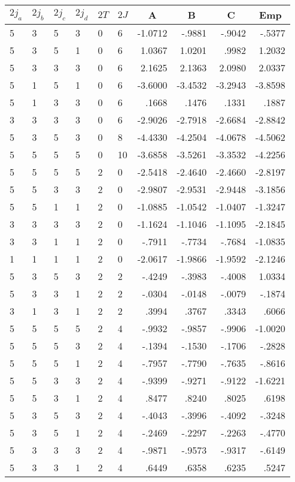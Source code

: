 \clearpage
\small
\begin{center}
\begin{tabular}{llllllrrrr}
\hline
$2j_{a}$&$2j_{b}$&$2j_{c}$&$2j_{d}$&$2T$&$2J$&
\multicolumn{1}{c}{A}&
\multicolumn{1}{c}{B}&
\multicolumn{1}{c}{C}&
\multicolumn{1}{c}{Emp}\\\hline
  5& 3& 5& 3& 0& 6& -1.0712&  -.9881&  -.9042&-.5377\\
  5& 3& 5& 1& 0& 6&  1.0367&  1.0201&   .9982&1.2032\\
  5& 3& 3& 3& 0& 6&  2.1625&  2.1363&  2.0980&2.0337\\
  5& 1& 5& 1& 0& 6& -3.6000& -3.4532& -3.2943&-3.8598\\
  5& 1& 3& 3& 0& 6&   .1668&   .1476&   .1331&.1887\\
  3& 3& 3& 3& 0& 6& -2.9026& -2.7918& -2.6684&-2.8842\\
  5& 3& 5& 3& 0& 8& -4.4330& -4.2504& -4.0678&-4.5062\\
  5& 5& 5& 5& 0&10& -3.6858& -3.5261& -3.3532&-4.2256\\
  5& 5& 5& 5& 2& 0& -2.5418& -2.4640& -2.4660&-2.8197\\
  5& 5& 3& 3& 2& 0& -2.9807& -2.9531& -2.9448&-3.1856\\
  5& 5& 1& 1& 2& 0& -1.0885& -1.0542& -1.0407&-1.3247\\
  3& 3& 3& 3& 2& 0& -1.1624& -1.1046& -1.1095&-2.1845\\
  3& 3& 1& 1& 2& 0&  -.7911&  -.7734&  -.7684&-1.0835\\
  1& 1& 1& 1& 2& 0& -2.0617& -1.9866& -1.9592&-2.1246\\
  5& 3& 5& 3& 2& 2&  -.4249&  -.3983&  -.4008&1.0334\\
  5& 3& 3& 1& 2& 2&  -.0304&  -.0148&  -.0079&-.1874\\
  3& 1& 3& 1& 2& 2&   .3994&   .3767&   .3343&.6066\\
  5& 5& 5& 5& 2& 4&  -.9932&  -.9857&  -.9906&-1.0020\\
  5& 5& 5& 3& 2& 4&  -.1394&  -.1530&  -.1706&-.2828\\
  5& 5& 5& 1& 2& 4&  -.7957&  -.7790&  -.7635&-.8616\\
  5& 5& 3& 3& 2& 4&  -.9399&  -.9271&  -.9122&-1.6221\\
  5& 5& 3& 1& 2& 4&   .8477&   .8240&   .8025&.6198\\
  5& 3& 5& 3& 2& 4&  -.4043&  -.3996&  -.4092&-.3248\\
  5& 3& 5& 1& 2& 4&  -.2469&  -.2297&  -.2263&-.4770\\
  5& 3& 3& 3& 2& 4&  -.9871&  -.9573&  -.9317&-.6149\\
  5& 3& 3& 1& 2& 4&   .6449&   .6358&   .6235&.5247\\
\hline
\end{tabular}
\end{center}
